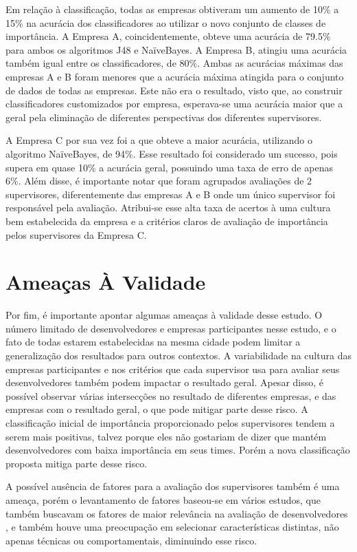 Em relação à classificação, todas as empresas obtiveram um aumento de 10\% a 15\% na acurácia dos classificadores ao utilizar o novo conjunto de classes de importância. A Empresa A, coincidentemente, obteve uma acurácia de 79.5\% para ambos os algoritmos J48 e NaïveBayes. A Empresa B, atingiu uma acurácia também igual entre os classificadores, de 80\%. Ambas as acurácias máximas das empresas A e B foram menores que a acurácia máxima atingida para o conjunto de dados de todas as empresas. Este não era o resultado, visto que, ao construir classificadores customizados por empresa, esperava-se uma acurácia maior que a geral pela eliminação de diferentes perspectivas dos diferentes supervisores.

A Empresa C por sua vez foi a que obteve a maior acurácia, utilizando o algoritmo NaïveBayes, de 94\%. Esse resultado foi considerado um sucesso, pois supera em quase 10\% a acurácia geral, possuindo uma taxa de erro de apenas 6\%. Além disse, é importante notar que foram agrupados avaliações de 2 supervisores, diferentemente das empresas A e B onde um único supervisor foi responsável pela avaliação. Atribui-se esse alta taxa de acertos à uma cultura bem estabelecida da empresa e a critérios claros de avaliação de importância pelos supervisores da Empresa C.

\section{Ameaças À Validade}

Por fim, é importante apontar algumas ameaças à validade desse estudo. O número limitado de desenvolvedores e empresas participantes nesse estudo, e o fato de todas estarem estabelecidas na mesma cidade podem limitar a generalização dos resultados para outros contextos. A variabilidade na cultura das empresas participantes e nos critérios que cada supervisor usa para avaliar seus desenvolvedores também podem impactar o resultado geral. Apesar disso, é possível observar várias intersecções no resultado de diferentes empresas, e das empresas com o resultado geral, o que pode mitigar parte desse risco. A classificação inicial de importância proporcionado pelos supervisores tendem a serem mais positivas, talvez porque eles não gostariam de dizer que mantém desenvolvedores com baixa importância em seus times. Porém a nova classificação proposta mitiga parte desse risco.

A possível ausência de fatores para a avaliação dos supervisores também é uma ameaça, porém o levantamento de fatores baseou-se em vários estudos, que também buscavam os fatores de maior relevância na avaliação de desenvolvedores , e também houve uma preocupação em selecionar características distintas, não apenas técnicas ou comportamentais, diminuindo esse risco.
